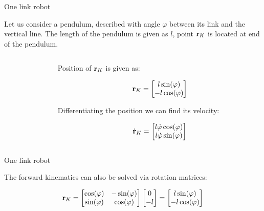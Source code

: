 \documentclass{beamer}
\begin{document}
\begin{frame}{One link robot}
	\begin{flushleft}
		
		Let us consider a pendulum, described with angle $\varphi$ between its link and the vertical line. The length of the pendulum is given as $l$, point $\mathbf{r}_K$ is located at end of the pendulum.
		
		\bigskip
		
		\begin{columns}
			\begin{column}{0.5\textwidth}
				
			\end{column}
			\begin{column}{0.5\textwidth}  %
				
				Position of $\mathbf{r}_K$ is given as:
				
				\begin{equation}
					\mathbf{r}_K = \begin{bmatrix}
						l \sin (\varphi) \\ 
						-l \cos (\varphi) 
					\end{bmatrix}
				\end{equation}
				
				Differentiating the position we can find its velocity:
				
				\begin{equation}
					\dot{\mathbf{r}}_K = \begin{bmatrix}
						 l \dot \varphi \cos (\varphi) \\ 
						 l \dot \varphi \sin (\varphi) 
					\end{bmatrix}
				\end{equation}
				
				
			\end{column}
		\end{columns}
		
		
	\end{flushleft}
\end{frame}



\begin{frame}{One link robot}
	\begin{flushleft}
		
		The forward kinematics can also be solved via rotation matrices:
		
		\begin{equation}
			\mathbf{r}_K = 
			\begin{bmatrix} \cos(\varphi) & -\sin (\varphi) \\ \sin (\varphi) & \cos(\varphi) \end{bmatrix}
			\begin{bmatrix}
				0 \\ 
				-l 
			\end{bmatrix}
		=
			\begin{bmatrix}
				l \sin (\varphi) \\ 
				-l \cos (\varphi) 
			\end{bmatrix}
		\end{equation}
		
		
		
		
	\end{flushleft}
\end{frame}
\end{document}
